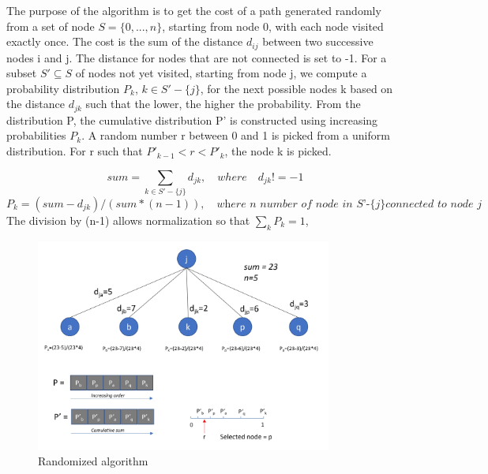 \documentclass[../report.tex]{subfiles}
\begin{document}
The purpose of the algorithm is to get the cost of a path generated randomly from a set of node $S=\{0,...,n\}$, starting from node 0, with each node visited exactly once. The cost is the sum of the distance $d_{ij}$ between two successive nodes i and j. The distance for nodes that are not connected is set to -1.
\newline{} 
For a subset $S'\subseteq S$ of nodes not yet visited, starting from node j, we compute a probability distribution $P_{k}$, $k \in S'-\{j\}$, for the next possible nodes k based on the distance $d_{jk}$ such that the lower, the higher the probability. From the distribution P, the cumulative distribution P' is constructed using increasing probabilities $P_{k}$.  A random number r between 0 and 1 is picked from a uniform distribution. For r such that $P'_{k-1}< r <P'_{k}$, the node k is picked.


\[ sum = \sum_{k \in S'-\{j\}} d_{jk}, \quad {where} \quad d_{jk}!=-1 \]   
\[ P_{k} = (sum - d_{jk})/(sum*(n-1)), \quad \textit{where n number of node in S'-\{j\} connected to node j}\]
The division by (n-1) allows normalization so that $\sum_{k} P_{k}=1$,

\begin{figure}[ht]
\centering
\includegraphics[height=7cm]{random_algo.jpg}
\caption{Randomized algorithm \label{overflow}}
\end{figure}
\end{document}
